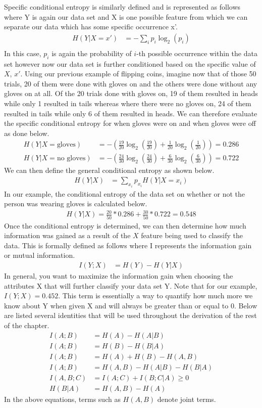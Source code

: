 \documentclass[book.tex]{subfiles}
\begin{document}
Specific conditional entropy is similarly defined and is represented as follows where Y is again our data set and X is one possible feature from which we can separate our data which has some specific occurrence x'.
\begin{align}
H(Y|X=x') &= -\sum_{i} p_i \log_2 (p_i)\\
\end{align}
In this case, $p_i$ is again the probability of $i$-th possible occurrence within the data set however now our data set is further conditioned based on the specific value of $X$, $x'$. Using our previous example of flipping coins, imagine now that of those 50 trials, 20 of them were done with gloves on and the others were done without any gloves on at all. Of the 20 trials done with gloves on, 19 of them resulted in heads while only 1 resulted in tails whereas where there were no gloves on, 24 of them resulted in tails while only 6 of them resulted in heads. We can therefore evaluate the specific conditional entropy for when gloves were on and when gloves were off as done below.
\begin{align}
H(Y|X=\textrm{gloves}) &= -(\frac{19}{20}\log_2(\frac{19}{20})+\frac{1}{20}\log_2(\frac{1}{20}))=0.286\\
H(Y|X=\textrm{no\ gloves}) &= -(\frac{24}{30}\log_2(\frac{24}{30})+\frac{6}{30}\log_2(\frac{6}{30}))=0.722
\end{align}
We can then define the general conditional entropy as shown below.
\begin{align}
H(Y|X) &= \sum_{x_i} p_{x_i} H(Y|X=x_i)
\end{align}
In our example, the conditional entropy of the data set on whether or not the person was wearing gloves is calculated below.
\begin{align}
H(Y|X) = \frac{20}{50} * 0.286 + \frac{30}{50} * 0.722=0.548
\end{align}
Once the conditional entropy is determined, we can then determine how much information was gained as a result of the $X$ feature being used to classify the data. This is formally defined as follows where I represents the information gain or mutual information.
\begin{align}
I(Y;X) &= H(Y) - H(Y|X)
\end{align}
In general, you want to maximize the information gain when choosing the attributes X that will further classify your data set Y. Note that for our example, $I(Y;X) = 0.452$. This term is essentially a way to quantify how much more we know about Y when given X and will always be greater than or equal to 0. Below are listed several identities that will be used throughout the derivation of the rest of the chapter.
\begin{align}
    I(A;B) &= H(A)-H(A|B)\\
    I(A;B) &= H(B)-H(B|A)\\
    I(A;B) &= H(A)+H(B)-H(A,B)\\
    I(A;B) &= H(A,B)-H(A|B)-H(B|A)\\
    I(A,B;C) &= I(A;C)+I(B;C|A)\geq 0\\
    H(B|A) &= H(A,B) - H(A)
\end{align}
In the above equations, terms such as $H(A,B)$ denote joint terms.
\end{document}
